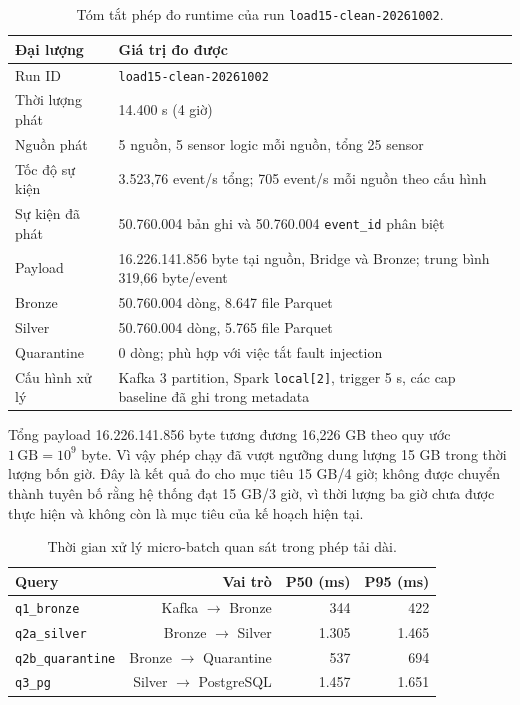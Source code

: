 \begin{table}[H]
\centering
\caption{Tóm tắt phép đo runtime của run \texttt{load15-clean-20261002}.}
\label{tab:measured-runtime}
\small
\begin{tabularx}{\textwidth}{l X}
\toprule
\textbf{Đại lượng} & \textbf{Giá trị đo được} \\
\midrule
Run ID & \texttt{load15-clean-20261002} \\
Thời lượng phát & 14.400 s (4 giờ) \\
Nguồn phát & 5 nguồn, 5 sensor logic mỗi nguồn, tổng 25 sensor \\
Tốc độ sự kiện & 3.523,76 event/s tổng; 705 event/s mỗi nguồn theo cấu hình \\
Sự kiện đã phát & 50.760.004 bản ghi và 50.760.004 \texttt{event\_id} phân biệt \\
Payload & 16.226.141.856 byte tại nguồn, Bridge và Bronze; trung bình 319,66 byte/event \\
Bronze & 50.760.004 dòng, 8.647 file Parquet \\
Silver & 50.760.004 dòng, 5.765 file Parquet \\
Quarantine & 0 dòng; phù hợp với việc tắt fault injection \\
Cấu hình xử lý & Kafka 3 partition, Spark \texttt{local[2]}, trigger 5 s, các cap baseline đã ghi trong metadata \\
\bottomrule
\end{tabularx}
\end{table}

Tổng payload 16.226.141.856 byte tương đương 16,226 GB theo quy ước
\(1\,\mathrm{GB}=10^9\) byte. Vì vậy phép chạy đã vượt ngưỡng dung lượng
15 GB trong thời lượng bốn giờ. Đây là kết quả đo cho mục tiêu 15 GB/4 giờ;
không được chuyển thành tuyên bố rằng hệ thống đạt 15 GB/3 giờ, vì thời
lượng ba giờ chưa được thực hiện và không còn là mục tiêu của kế hoạch hiện
tại.

\begin{table}[H]
\centering
\caption{Thời gian xử lý micro-batch quan sát trong phép tải dài.}
\label{tab:measured-spark}
\begin{tabular}{lrrr}
\toprule
\textbf{Query} & \textbf{Vai trò} & \textbf{P50 (ms)} & \textbf{P95 (ms)} \\
\midrule
\texttt{q1\_bronze} & Kafka $\rightarrow$ Bronze & 344 & 422 \\
\texttt{q2a\_silver} & Bronze $\rightarrow$ Silver & 1.305 & 1.465 \\
\texttt{q2b\_quarantine} & Bronze $\rightarrow$ Quarantine & 537 & 694 \\
\texttt{q3\_pg} & Silver $\rightarrow$ PostgreSQL & 1.457 & 1.651 \\
\bottomrule
\end{tabular}
\end{table}

